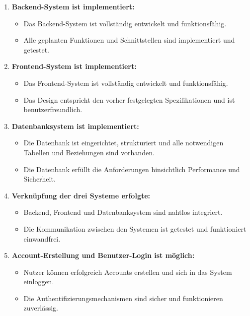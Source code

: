 \begin{enumerate}
    \item \textbf{Backend-System ist implementiert:}
    \begin{itemize}[label=--, itemsep=0pt, parsep=0pt]
        \item Das Backend-System ist vollständig entwickelt und funktionsfähig.
        \item Alle geplanten Funktionen und Schnittstellen sind implementiert und getestet.
    \end{itemize}

    \item \textbf{Frontend-System ist implementiert:}
    \begin{itemize}[label=--, itemsep=0pt, parsep=0pt]
        \item Das Frontend-System ist vollständig entwickelt und funktionsfähig.
        \item Das Design entspricht den vorher festgelegten Spezifikationen und ist benutzerfreundlich.
    \end{itemize}

    \item \textbf{Datenbanksystem ist implementiert:}
    \begin{itemize}[label=--, itemsep=0pt, parsep=0pt]
        \item Die Datenbank ist eingerichtet, strukturiert und alle notwendigen Tabellen und Beziehungen sind vorhanden.
        \item Die Datenbank erfüllt die Anforderungen hinsichtlich Performance und Sicherheit.
    \end{itemize}

    \item \textbf{Verknüpfung der drei Systeme erfolgte:}
    \begin{itemize}[label=--, itemsep=0pt, parsep=0pt]
        \item Backend, Frontend und Datenbanksystem sind nahtlos integriert.
        \item Die Kommunikation zwischen den Systemen ist getestet und funktioniert einwandfrei.
    \end{itemize}

    \item \textbf{Account-Erstellung und Benutzer-Login ist möglich:}
    \begin{itemize}[label=--, itemsep=0pt, parsep=0pt]
        \item Nutzer können erfolgreich Accounts erstellen und sich in das System einloggen.
        \item Die Authentifizierungsmechanismen sind sicher und funktionieren zuverlässig.
    \end{itemize}


\end{enumerate}
